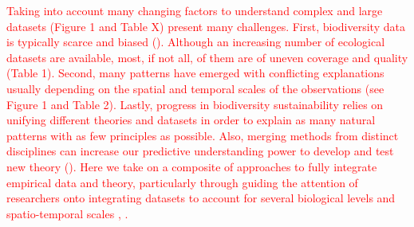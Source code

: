 \documentclass[12pt,a4paper]{article}
\begin{document}

\textcolor{red}{Taking into account many changing factors to understand complex and large datasets (Figure 1 and Table X) present many challenges. First, biodiversity data is typically scarce and biased (\citep{hortal2015seven}). Although an increasing number of ecological datasets are available, most, if not all, of them are of uneven coverage and quality (Table 1). Second, many patterns have emerged with conflicting explanations usually depending on the spatial and temporal scales of the observations (see Figure 1 and Table 2). Lastly, progress in biodiversity sustainability relies on unifying different theories and datasets in order to explain as many natural patterns with as few principles as possible. Also, merging methods from distinct disciplines can increase our predictive understanding power to develop and test new theory (\citep{reichstein2019deep}). Here we take on a composite of approaches to fully integrate empirical data and theory, particularly through guiding the attention of researchers onto integrating datasets to account for several biological levels and spatio-temporal scales \citep{melian2018deciphering}, \citep{poisot2019data}.}
\end{document}
